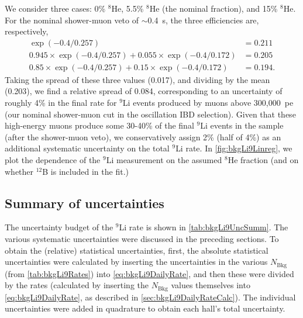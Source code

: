 \documentclass[../thesis.tex]{subfiles}
\begin{document}
We consider three cases: 0\% $^8$He, 5.5\% $^8$He (the nominal fraction), and 15\% $^8$He. For the nominal shower-muon veto of $\sim$0.4~s, the three efficiencies are, respectively,
\begin{align*}
  \exp(-0.4/0.257) &= 0.211 \\
  0.945 \times \exp(-0.4/0.257) + 0.055 \times \exp(-0.4/0.172) &= 0.205 \\
  0.85 \times \exp(-0.4/0.257) + 0.15 \times \exp(-0.4/0.172) &= 0.194.
\end{align*}
Taking the spread of these three values (0.017), and dividing by the mean (0.203), we find a relative spread of 0.084, corresponding to an uncertainty of roughly 4\% in the final rate for $^9$Li events produced by muons above 300,000~pe (our nominal shower-muon cut in the oscillation IBD selection). Given that these high-energy muons produce some 30-40\% of the final $^9$Li events in the sample (after the shower-muon veto), we conservatively assign 2\% (half of 4\%) as an additional systematic uncertainty on the total $^9$Li rate. In \autoref{fig:bkgLi9Linreg}, we plot the dependence of the $^9$Li measurement on the assumed $^8$He fraction (and on whether $^{12}$B is included in the fit.)

\subsection{Summary of uncertainties}
\label{sec:bkgLi9UncSumm}

The uncertainty budget of the $^9$Li rate is shown in \autoref{tab:bkgLi9UncSumm}. The various systematic uncertainties were discussed in the preceding sections. To obtain the (relative) statistical uncertainties, first, the absolute statistical uncertainties were calculated by inserting the uncertainties in the various $N_{\mathrm{Bkg}}$ (from \autoref{tab:bkgLi9Rates}) into \autoref{eq:bkgLi9DailyRate}, and then these were divided by the rates (calculated by inserting the $N_{\mathrm{Bkg}}$ values themselves into \autoref{eq:bkgLi9DailyRate}, as described in \autoref{sec:bkgLi9DailyRateCalc}). The individual uncertainties were added in quadrature to obtain each hall's total uncertainty.
\end{document}
